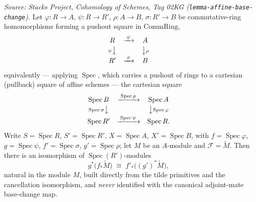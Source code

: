 \begin{lemma}
  \label{lem:affine_pushforward_pullback_baseChange}
  \textit{Source: Stacks Project, Cohomology of Schemes, Tag 02KG
  (\texttt{lemma-affine-base-change}).}
  Let \(\varphi : R \to A\), \(\psi : R \to R'\), \(\rho : A \to B\),
  \(\sigma : R' \to B\) be commutative-ring homomorphisms forming a pushout square in
  \(\mathrm{CommRing}\),
  \[
    \begin{array}{ccc}
      R & \xrightarrow{\;\varphi\;} & A \\[2pt]
      {\scriptstyle \psi}\big\downarrow & & \big\downarrow{\scriptstyle \rho} \\[2pt]
      R' & \xrightarrow{\;\sigma\;} & B
    \end{array}
  \]
  equivalently --- applying \(\operatorname{Spec}\), which carries a pushout of rings to
  a cartesian (pullback) square of affine schemes --- the cartesian square
  \[
    \begin{array}{ccc}
      \operatorname{Spec} B & \xrightarrow{\;\operatorname{Spec}\rho\;}
        & \operatorname{Spec} A \\[2pt]
      {\scriptstyle \operatorname{Spec}\sigma}\big\downarrow & &
        \big\downarrow{\scriptstyle \operatorname{Spec}\varphi} \\[2pt]
      \operatorname{Spec} R' & \xrightarrow{\;\operatorname{Spec}\psi\;}
        & \operatorname{Spec} R .
    \end{array}
  \]
  Write \(S = \operatorname{Spec} R\), \(S' = \operatorname{Spec} R'\),
  \(X = \operatorname{Spec} A\), \(X' = \operatorname{Spec} B\), with
  \(f = \operatorname{Spec}\varphi\), \(g = \operatorname{Spec}\psi\),
  \(f' = \operatorname{Spec}\sigma\), \(g' = \operatorname{Spec}\rho\); let \(M\) be an
  \(A\)-module and \(\mathcal{F} = \widetilde{M}\). Then there is an isomorphism of
  \(\operatorname{Spec}(R')\)-modules
  \[
    g^*\bigl(f_*\widetilde{M}\bigr)
    \;\cong\;
    f'_*\bigl((g')^*\widetilde{M}\bigr),
  \]
  natural in the module \(M\), built directly from the tilde primitives and the
  cancellation isomorphism, and \emph{never} identified with the canonical
  adjoint-mate base-change map.

\end{lemma}

